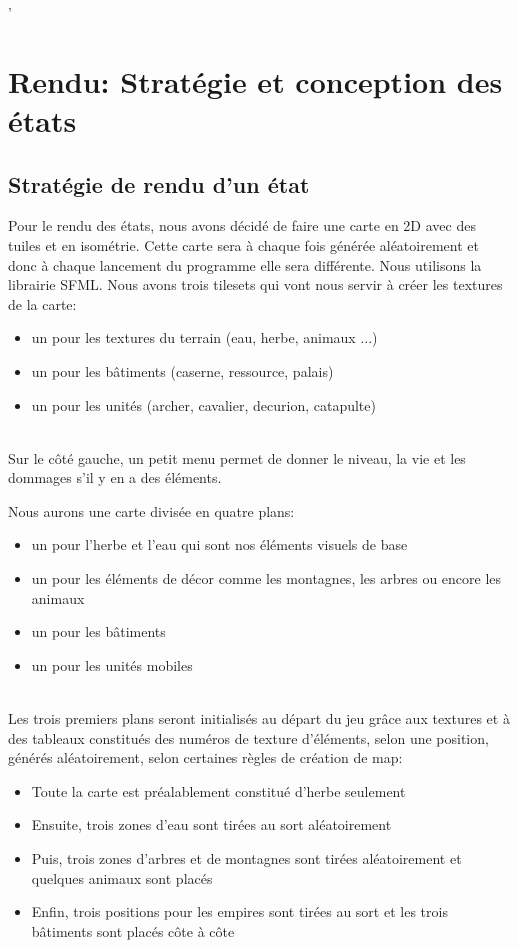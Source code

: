 \documentclass[12pt,a4paper]{article}
\begin{document}
\newpage
 '
\newpage
\section{Rendu: Stratégie et conception des états}
\subsection{Stratégie de rendu d'un état}

Pour le rendu des états, nous avons décidé de faire une carte en 2D avec des tuiles et en isométrie. Cette carte sera à chaque fois générée aléatoirement et donc à chaque lancement du programme elle sera différente. Nous utilisons la librairie SFML. Nous avons trois tilesets qui vont nous servir à créer les textures de la carte: 
\begin{itemize}
\item un pour les textures du terrain (eau, herbe, animaux ...)
\item un pour les bâtiments (caserne, ressource, palais)
\item un pour les unités (archer, cavalier, decurion, catapulte)
\end{itemize}\\

Sur le côté gauche, un petit menu permet de donner le niveau, la vie et les dommages s'il y en a des éléments.

Nous aurons une carte divisée en quatre plans: 
\begin{itemize}
\item un pour l'herbe et l'eau qui sont nos éléments visuels de base
\item un pour les éléments de décor comme les montagnes, les arbres ou encore les animaux
\item un pour les bâtiments
\item un pour les unités mobiles
\end{itemize}\\

Les trois premiers plans seront initialisés au départ du jeu grâce aux textures et à des tableaux constitués des numéros de texture d'éléments, selon une position, générés aléatoirement, selon certaines règles de création de map:
\begin{itemize}
\item Toute la carte est préalablement constitué d'herbe seulement
\item Ensuite, trois zones d'eau sont tirées au sort aléatoirement
\item Puis, trois zones d'arbres et de montagnes sont tirées  aléatoirement et quelques animaux sont placés
\item Enfin, trois positions pour les empires sont tirées au sort et les trois bâtiments sont placés côte à côte
\end{itemize}\\
\end{document}
